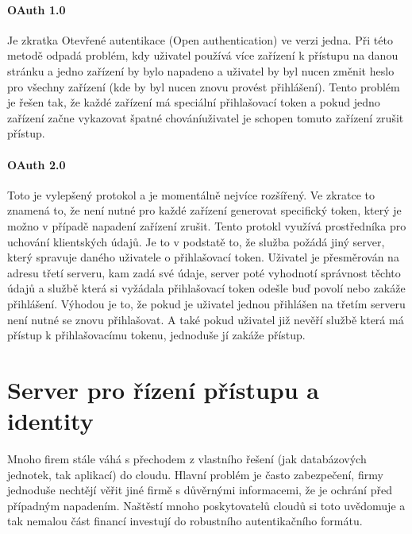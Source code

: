 \paragraph{OAuth 1.0} Je zkratka Otevřené autentikace (Open authentication) ve verzi jedna. Při této metodě odpadá problém, kdy uživatel používá více zařízení k přístupu na danou stránku a jedno zařízení by bylo napadeno a uživatel by byl nucen změnit heslo pro všechny zařízení (kde by byl nucen znovu provést přihlášení). Tento problém je řešen tak, že každé zařízení má speciální přihlašovací token a pokud jedno zařízení začne vykazovat špatné chováníuživatel je schopen tomuto zařízení zrušit přístup. \cite{rest-cookbook}

\paragraph{OAuth 2.0} Toto je vylepšený protokol a je momentálně nejvíce rozšířený. Ve zkratce to znamená to, že není nutné pro každé zařízení generovat specifický token, který je možno v případě napadení zařízení zrušit. Tento protokl využívá prostředníka pro uchování klientských údajů. Je to v podstatě to, že služba požádá jiný server, který spravuje daného uživatele o přihlašovací token. Uživatel je přesměrován na adresu třetí serveru, kam zadá své údaje, server poté vyhodnotí správnost těchto údajů a službě která si vyžádala přihlašovací token odešle buď povolí nebo zakáže přihlášení. Výhodou je to, že pokud je uživatel jednou přihlášen na třetím serveru není nutné se znovu přihlašovat. A také pokud uživatel již nevěří službě která má přístup k přihlašovacímu tokenu, jednoduše jí zakáže přístup. \cite{rest-cookbook}

\section{Server pro řízení přístupu a identity}
\par Mnoho firem stále váhá s přechodem z vlastního řešení (jak databázových jednotek, tak aplikací) do cloudu. Hlavní problém je často zabezpečení, firmy jednoduše nechtějí věřit jiné firmě s důvěrnými informacemi, že je ochrání před případným napadením. Naštěstí mnoho poskytovatelů cloudů si toto uvědomuje a tak nemalou část financí investují do robustního autentikačního formátu. \cite{cloud-security}

